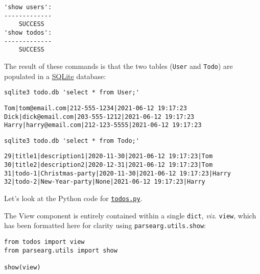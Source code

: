 \documentclass[10pt]{amsart}
\numberwithin{equation}{section}
\begin{document}
\begin{verbatim}
'show users':
-------------
	SUCCESS
'show todos':
-------------
	SUCCESS
\end{verbatim}


The result of these commands is that the two tables (\texttt{User} and \texttt{Todo})
are populated in a \href{https://www.sqlite.org/index.html}{SQLite} database:
\begin{verbatim}
sqlite3 todo.db 'select * from User;'
\end{verbatim}

\begin{verbatim}
Tom|tom@email.com|212-555-1234|2021-06-12 19:17:23
Dick|dick@email.com|203-555-1212|2021-06-12 19:17:23
Harry|harry@email.com|212-123-5555|2021-06-12 19:17:23
\end{verbatim}


\begin{verbatim}
sqlite3 todo.db 'select * from Todo;'
\end{verbatim}

\begin{verbatim}
29|title1|description1|2020-11-30|2021-06-12 19:17:23|Tom
30|title2|description2|2020-12-31|2021-06-12 19:17:23|Tom
31|todo-1|Christmas-party|2020-11-30|2021-06-12 19:17:23|Harry
32|todo-2|New-Year-party|None|2021-06-12 19:17:23|Harry
\end{verbatim}


Let's look at the Python code for \href{https://github.com/tharte/parsearg/blob/master/doc/examples/todos.py}{\texttt{todos.py}}.

The View component is entirely contained within a single \texttt{dict}, \emph{viz.} 
\texttt{view}, which has been formatted here for clarity using \texttt{parsearg.utils.show}:
\begin{verbatim}
from todos import view
from parsearg.utils import show

show(view)
\end{verbatim}
\end{document}
